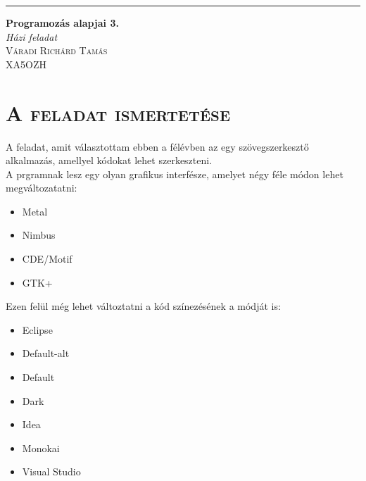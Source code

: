 \documentclass[12pt]{article}
\begin{document}

\begin{titlepage}
  \raggedleft
  \rule{1pt}{\textheight}
  \hspace{0.05\textwidth}
  \parbox[b]{0.75\textwidth}{
    {\Huge\bfseries Programozás alapjai 3. }\\
    [2\baselineskip]
    {\Large\textit{Házi feladat}}\\
    [4\baselineskip]
    {\Large\textsc{Váradi Richárd Tamás}}\\
    [1\baselineskip]
    {\Large\textsc{XA5OZH}}
    \vspace{0.5\textheight}
  }
\end{titlepage}

\section*{\textsc{A feladat ismertetése}}
A feladat, amit választottam ebben a félévben az egy szövegszerkesztő alkalmazás,
amellyel kódokat lehet szerkeszteni. \\
A prgramnak lesz egy olyan grafikus interfésze, amelyet négy féle módon lehet
megváltozatatni:

\begin{multicols}{2}
  \begin{itemize}
    \item Metal
    \item Nimbus
    \item CDE/Motif
    \item GTK+
  \end{itemize}
\end{multicols}

Ezen felül még lehet változtatni a kód színezésének a módját is:
\begin{multicols}{2}
  \begin{itemize}
    \item Eclipse
    \item Default-alt
    \item Default
    \item Dark
    \item Idea
    \item Monokai
    \item Visual Studio
  \end{itemize}
\end{multicols}
\end{document}
